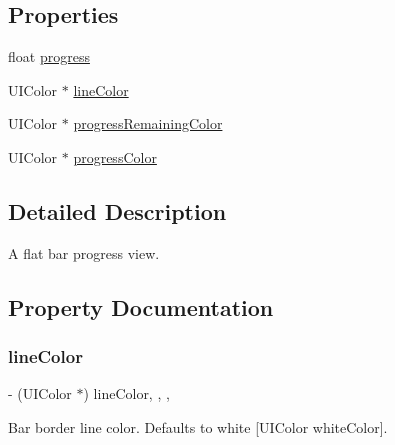 \subsection*{Properties}
\begin{DoxyCompactItemize}
\item 
float \mbox{\hyperlink{interface_m_b_bar_progress_view_aa34865ca266850eb7060e91309f3512b}{progress}}
\item 
U\+I\+Color $\ast$ \mbox{\hyperlink{interface_m_b_bar_progress_view_a132cf9113ebf2ac99b0d7721abdfeb2a}{line\+Color}}
\item 
U\+I\+Color $\ast$ \mbox{\hyperlink{interface_m_b_bar_progress_view_a5f6841a883120376724ae875e09790c3}{progress\+Remaining\+Color}}
\item 
U\+I\+Color $\ast$ \mbox{\hyperlink{interface_m_b_bar_progress_view_a4d81d1482e7071cb2d18105eb45f5463}{progress\+Color}}
\end{DoxyCompactItemize}


\subsection{Detailed Description}
A flat bar progress view. 

\subsection{Property Documentation}
\mbox{\label{interface_m_b_bar_progress_view_a132cf9113ebf2ac99b0d7721abdfeb2a}} 
\subsubsection{\texorpdfstring{line\+Color}{lineColor}}
{\footnotesize\ttfamily -\/ (U\+I\+Color $\ast$) line\+Color\hspace{0.3cm}{\ttfamily [read]}, {\ttfamily [write]}, {\ttfamily [nonatomic]}, {\ttfamily [assign]}}

Bar border line color. Defaults to white \mbox{[}U\+I\+Color white\+Color\mbox{]}. \mbox{\label{interface_m_b_bar_progress_view_aa34865ca266850eb7060e91309f3512b}} 
